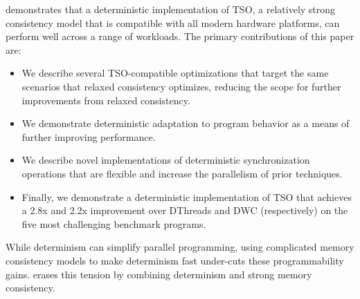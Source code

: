 \lib demonstrates that a deterministic implementation of TSO, a relatively strong consistency model that is compatible with all modern hardware platforms, can perform well across a range of workloads. The primary contributions of this paper are:
\begin{itemize}
\item We describe several TSO-compatible optimizations that target the same scenarios that relaxed consistency optimizes, reducing the scope for further improvements from relaxed consistency.
\item We demonstrate deterministic adaptation to program behavior as a means of further improving performance.
\item We describe novel implementations of deterministic synchronization operations that are flexible and increase the parallelism of prior techniques.
\item Finally, we demonstrate a deterministic implementation of TSO that achieves a 2.8x and 2.2x improvement over DThreads \cite{liu_dthreads:_2011} and DWC \cite{merrifield_conversion:_2013} (respectively) on the five most challenging benchmark programs.

\newpage

\end{itemize}
While determinism can simplify parallel programming, using complicated memory consistency models to make determinism fast under-cuts these programmability gains. \lib erases this tension by combining determinism and strong memory consistency.


